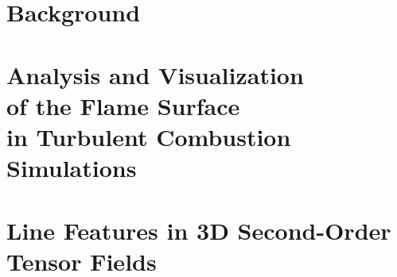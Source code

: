 
%
\part{Background} %
\label{part:background}
%

%

%
%
\part[Analysis and Visualization of the Flame Surface
         in Turbulent Combustion Simulations]
        {Analysis and Visualization\\of the Flame Surface\\
         in Turbulent Combustion Simulations} %
\label{part:flame_vis}
%

%

%

%
%
\part[Line Features in 3D Second-Order Tensor Fields]
    {Line Features in 3D Second-Order\\Tensor Fields} %
\label{part:tensor_vis}
%

%

%

%
%
%
\appendix\appendixtrue
%

%

%
